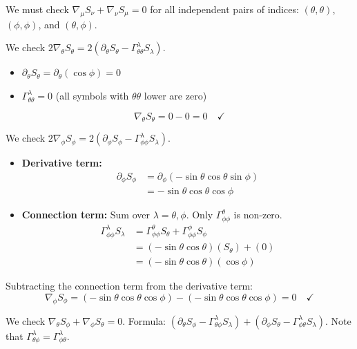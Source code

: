 \documentclass[11pt, a4paper]{report}
\begin{document}
We must check $\nabla_\mu S_\nu + \nabla_\nu S_\mu = 0$ for all independent pairs of indices: $(\theta, \theta)$, $(\phi, \phi)$, and $(\theta, \phi)$.

We check $2\nabla_\theta S_\theta = 2(\partial_\theta S_\theta - \Gamma^\lambda_{\theta\theta} S_\lambda)$.
\begin{itemize}
    \item $\partial_\theta S_\theta = \partial_\theta(\cos\phi) = 0$
    \item $\Gamma^\lambda_{\theta\theta} = 0$ (all symbols with $\theta\theta$ lower are zero)
\end{itemize}
\begin{equation}
\nabla_\theta S_\theta = 0 - 0 = 0 \quad \checkmark
\end{equation}

We check $2\nabla_\phi S_\phi = 2(\partial_\phi S_\phi - \Gamma^\lambda_{\phi\phi} S_\lambda)$.
\begin{itemize}
    \item \textbf{Derivative term:}
    \begin{align*}
    \partial_\phi S_\phi &= \partial_\phi(-\sin\theta\cos\theta\sin\phi) \\
    &= -\sin\theta\cos\theta \cos\phi
    \end{align*}
    \item \textbf{Connection term:}
    Sum over $\lambda = \theta, \phi$. Only $\Gamma^\theta_{\phi\phi}$ is non-zero.
    \begin{align*}
    \Gamma^\lambda_{\phi\phi} S_\lambda &= \Gamma^\theta_{\phi\phi} S_\theta + \Gamma^\phi_{\phi\phi} S_\phi \\
    &= (-\sin\theta\cos\theta)(S_\theta) + (0) \\
    &= (-\sin\theta\cos\theta)(\cos\phi)
    \end{align*}
\end{itemize}
Subtracting the connection term from the derivative term:
\begin{equation}
\nabla_\phi S_\phi = (-\sin\theta\cos\theta\cos\phi) - (-\sin\theta\cos\theta\cos\phi) = 0 \quad \checkmark
\end{equation}

We check $\nabla_\theta S_\phi + \nabla_\phi S_\theta = 0$.
Formula: $(\partial_\theta S_\phi - \Gamma^\lambda_{\theta\phi} S_\lambda) + (\partial_\phi S_\theta - \Gamma^\lambda_{\phi\theta} S_\lambda)$.
Note that $\Gamma^\lambda_{\theta\phi} = \Gamma^\lambda_{\phi\theta}$.
\end{document}
